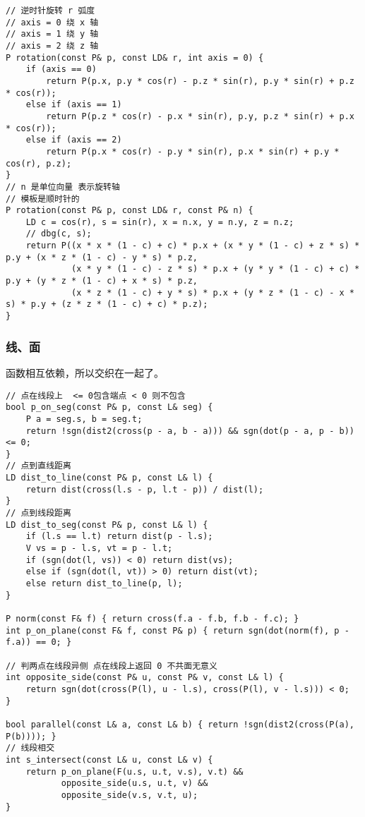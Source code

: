 \documentclass[]{article}
\begin{document}
\begin{verbatim}
// 逆时针旋转 r 弧度
// axis = 0 绕 x 轴
// axis = 1 绕 y 轴
// axis = 2 绕 z 轴
P rotation(const P& p, const LD& r, int axis = 0) {
    if (axis == 0)
        return P(p.x, p.y * cos(r) - p.z * sin(r), p.y * sin(r) + p.z * cos(r));
    else if (axis == 1)
        return P(p.z * cos(r) - p.x * sin(r), p.y, p.z * sin(r) + p.x * cos(r));
    else if (axis == 2)
        return P(p.x * cos(r) - p.y * sin(r), p.x * sin(r) + p.y * cos(r), p.z);
}
// n 是单位向量 表示旋转轴
// 模板是顺时针的
P rotation(const P& p, const LD& r, const P& n) {
    LD c = cos(r), s = sin(r), x = n.x, y = n.y, z = n.z;
    // dbg(c, s);
    return P((x * x * (1 - c) + c) * p.x + (x * y * (1 - c) + z * s) * p.y + (x * z * (1 - c) - y * s) * p.z,
             (x * y * (1 - c) - z * s) * p.x + (y * y * (1 - c) + c) * p.y + (y * z * (1 - c) + x * s) * p.z,
             (x * z * (1 - c) + y * s) * p.x + (y * z * (1 - c) - x * s) * p.y + (z * z * (1 - c) + c) * p.z);
}
\end{verbatim}

\hypertarget{ux7ebfux9762}{%
\subsubsection{线、面}\label{ux7ebfux9762}}

函数相互依赖，所以交织在一起了。

\begin{verbatim}
// 点在线段上  <= 0包含端点 < 0 则不包含
bool p_on_seg(const P& p, const L& seg) {
    P a = seg.s, b = seg.t;
    return !sgn(dist2(cross(p - a, b - a))) && sgn(dot(p - a, p - b)) <= 0;
}
// 点到直线距离
LD dist_to_line(const P& p, const L& l) {
    return dist(cross(l.s - p, l.t - p)) / dist(l);
}
// 点到线段距离
LD dist_to_seg(const P& p, const L& l) {
    if (l.s == l.t) return dist(p - l.s);
    V vs = p - l.s, vt = p - l.t;
    if (sgn(dot(l, vs)) < 0) return dist(vs);
    else if (sgn(dot(l, vt)) > 0) return dist(vt);
    else return dist_to_line(p, l);
}

P norm(const F& f) { return cross(f.a - f.b, f.b - f.c); }
int p_on_plane(const F& f, const P& p) { return sgn(dot(norm(f), p - f.a)) == 0; }

// 判两点在线段异侧 点在线段上返回 0 不共面无意义
int opposite_side(const P& u, const P& v, const L& l) {
    return sgn(dot(cross(P(l), u - l.s), cross(P(l), v - l.s))) < 0;
}

bool parallel(const L& a, const L& b) { return !sgn(dist2(cross(P(a), P(b)))); }
// 线段相交
int s_intersect(const L& u, const L& v) {
    return p_on_plane(F(u.s, u.t, v.s), v.t) && 
           opposite_side(u.s, u.t, v) &&
           opposite_side(v.s, v.t, u);
}
\end{verbatim}
\end{document}
